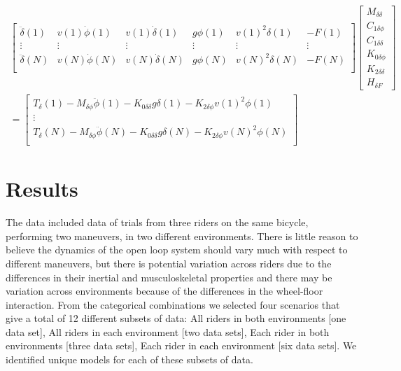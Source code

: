 \documentclass[a4paper]{article}
\begin{document}
\small{
\begin{align}
  \begin{bmatrix}
    \ddot{\delta}(1) &
    v(1) \dot{\phi}(1) &
    v(1) \dot{\delta}(1) &
    g \phi(1) &
    v(1)^2 \delta(1) &
    - F(1)\\
    \vdots & \vdots & \vdots & \vdots & \vdots & \vdots \\
    \ddot{\delta}(N) &
    v(N) \dot{\phi}(N) &
    v(N) \dot{\delta}(N) &
    g \phi(N) &
    v(N)^2 \delta(N) &
    - F(N)\\
  \end{bmatrix}
  \begin{bmatrix}
    M_{\delta\delta} \\
    C_{1\delta\phi} \\
    C_{1\delta\delta} \\
    K_{0\delta\phi} \\
    K_{2\delta\delta} \\
    H_{\delta F}
  \end{bmatrix} \nonumber \\
  =
  \begin{bmatrix}
    T_\delta(1)
    - M_{\delta\phi} \ddot{\phi}(1)
    - K_{0\delta\delta} g \delta(1)
    - K_{2\delta\phi} v(1)^2 \phi(1) \\
    \vdots\\
    T_\delta(N)
    - M_{\delta\phi} \ddot{\phi}(N)
    - K_{0\delta\delta} g \delta(N)
    - K_{2\delta\phi} v(N)^2 \phi(N) \\
  \end{bmatrix}
\end{align}
}

\section*{Results}

The data included data of trials from three riders on the same bicycle,
performing two maneuvers, in two different environments. There is little reason
to believe the dynamics of the open loop system should vary much with respect
to different maneuvers, but there is potential variation across riders due to
the differences in their inertial and musculoskeletal properties and there may
be variation across environments because of the differences in the wheel-floor
interaction. From the categorical combinations we selected four scenarios that
give a total of 12 different subsets of data: All riders in both environments
[one data set], All riders in each environment [two data sets], Each rider in
both environments [three data sets], Each rider in each environment [six data
sets]. We identified unique models for each of these subsets of data.
\end{document}
